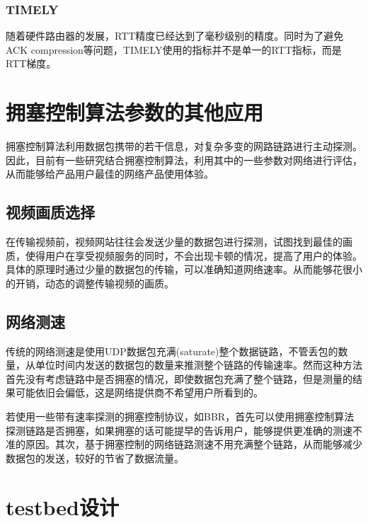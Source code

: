 \documentclass[a4paper, 12pt, UTF8]{ctexart}
\begin{document}
\subsubsection{TIMELY}
\par 随着硬件路由器的发展，RTT精度已经达到了毫秒级别的精度。同时为了避免ACK compression等问题，TIMELY\cite{DBLP:conf/sigcomm/MittalLDBWGVWWZ15}使用的指标并不是单一的RTT指标，而是RTT梯度。

\clearpage

\section{拥塞控制算法参数的其他应用}
\par 拥塞控制算法利用数据包携带的若干信息，对复杂多变的网路链路进行主动探测。因此，目前有一些研究结合拥塞控制算法，利用其中的一些参数对网络进行评估，从而能够给产品用户最佳的网络产品使用体验。

\subsection{视频画质选择}
\par 在传输视频前，视频网站往往会发送少量的数据包进行探测，试图找到最佳的画质\cite{DBLP:conf/nsdi/YanAZFHZLW20}，使得用户在享受视频服务的同时，不会出现卡顿的情况，提高了用户的体验。具体的原理时通过少量的数据包的传输，可以准确知道网络速率。从而能够花很小的开销，动态的调整传输视频的画质。

\subsection{网络测速}
\par 传统的网络测速是使用UDP数据包充满(saturate)整个数据链路，不管丢包的数量，从单位时间内发送的数据包的数量来推测整个链路的传输速率。然而这种方法首先没有考虑链路中是否拥塞的情况，即使数据包充满了整个链路，但是测量的结果可能依旧会偏低，这是网络提供商不希望用户所看到的。
\par 若使用一些带有速率探测的拥塞控制协议，如BBR，首先可以使用拥塞控制算法探测链路是否拥塞，如果拥塞的话可能提早的告诉用户，能够提供更准确的测速不准的原因\cite{DBLP:conf/imc/SundaresanDFLD17}。其次，基于拥塞控制的网络链路测速不用充满整个链路，从而能够减少数据包的发送，较好的节省了数据流量。


\clearpage 

\section{testbed设计}
\end{document}
